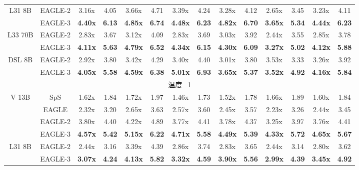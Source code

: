 \documentclass[11pt]{article}
\begin{document}
\begin{table}[h]
{\begin{tabular}{cccccccccccccc}
    \midrule
    \multirow{2}[2]{*}{L31 8B} & EAGLE-2 & 3.16x & 4.05  & 3.66x & 4.71  & 3.39x & 4.24  & 3.28x & 4.12  & 2.65x & 3.45  & 3.23x & 4.11 \\
          & EAGLE-3 & \textbf{4.40x} & \textbf{6.13} & \textbf{4.85x} & \textbf{6.74} & \textbf{4.48x} & \textbf{6.23} & \textbf{4.82x} & \textbf{6.70} & \textbf{3.65x} & \textbf{5.34} & \textbf{4.44x} & \textbf{6.23} \\
    \midrule
    \multirow{2}[1]{*}{L33 70B} & EAGLE-2 & 2.83x & 3.67  & 3.12x & 4.09  & 2.83x & 3.69  & 3.03x & 3.92  & 2.44x & 3.55  & 2.85x & 3.78 \\
          & EAGLE-3 & \textbf{4.11x} & \textbf{5.63} & \textbf{4.79x} & \textbf{6.52} & \textbf{4.34x} & \textbf{6.15} & \textbf{4.30x} & \textbf{6.09} & \textbf{3.27x} & \textbf{5.02} & \textbf{4.12x} & \textbf{5.88} \\
    \midrule
    \multirow{2}[1]{*}{DSL 8B} & EAGLE-2 & 2.92x & 3.80  & 3.42x & 4.29  & 3.40x & 4.40  & 3.01x & 3.80  & 3.53x & 3.33  & 3.26x & 3.92 \\
          & EAGLE-3 & \textbf{4.05x} & \textbf{5.58} & \textbf{4.59x} & \textbf{6.38} & \textbf{5.01x} & \textbf{6.93} & \textbf{3.65x} & \textbf{5.37} & \textbf{3.52x} & \textbf{4.92} & \textbf{4.16x} & \textbf{5.84} \\
    \midrule
    \multicolumn{14}{c}{温度=1} \\
    \midrule
    \multirow{4}[2]{*}{V 13B} & SpS   & 1.62x & 1.84  & 1.72x & 1.97  & 1.46x & 1.73  & 1.52x & 1.78  & 1.66x & 1.89  & 1.60x & 1.84 \\
          & EAGLE & 2.32x & 3.20  & 2.65x & 3.63  & 2.57x & 3.60  & 2.45x & 3.57  & 2.23x & 3.26  & 2.44x & 3.45 \\
          & EAGLE-2 & 3.80x & 4.40  & 4.22x & 4.89  & 3.77x & 4.41  & 3.78x & 4.37  & 3.25x & 3.97  & 3.76x & 4.41 \\
          & EAGLE-3 & \textbf{4.57x} & \textbf{5.42} & \textbf{5.15x} & \textbf{6.22} & \textbf{4.71x} & \textbf{5.58} & \textbf{4.49x} & \textbf{5.39} & \textbf{4.33x} & \textbf{5.72} & \textbf{4.65x} & \textbf{5.67} \\
    \midrule
    \multirow{2}[2]{*}{L31 8B} & EAGLE-2 & 2.44x & 3.16  & 3.39x & 4.39  & 2.86x & 3.74  & 2.83x & 3.65  & 2.44x & 3.14  & 2.80x & 3.62 \\
          & EAGLE-3 & \textbf{3.07x} & \textbf{4.24} & \textbf{4.13x} & \textbf{5.82} & \textbf{3.32x} & \textbf{4.59} & \textbf{3.90x} & \textbf{5.56} & \textbf{2.99x} & \textbf{4.39} & \textbf{3.45x} & \textbf{4.92} \\

\end{tabular}}
\end{table}
\end{document}

